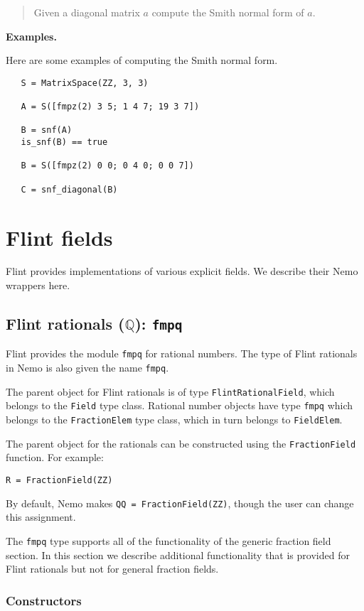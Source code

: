 \documentclass[a4paper,10pt]{article}
\newcommand{\Q}{\mathbb{Q}}
\newcommand{\code}{\lstinline}
\newcommand{\desc}[1]{\vspace{-3mm}\begin{quote}#1\end{quote}}
\begin{document}
{{\desc{Given a diagonal matrix $a$ compute the Smith normal form of $a$.}

\textbf{Examples.}

Here are some examples of computing the Smith normal form.

\begin{lstlisting}
   S = MatrixSpace(ZZ, 3, 3)

   A = S([fmpz(2) 3 5; 1 4 7; 19 3 7])
   
   B = snf(A)
   is_snf(B) == true

   B = S([fmpz(2) 0 0; 0 4 0; 0 0 7])

   C = snf_diagonal(B)
\end{lstlisting}

\section{Flint fields}

Flint provides implementations of various explicit fields. We describe their
Nemo wrappers here.

\subsection{Flint rationals ($\Q$): \code|fmpq|}

Flint provides the module \code{fmpq} for rational numbers. The type of Flint rationals
in Nemo is also given the name \code{fmpq}.

The parent object for Flint rationals is of type \code{FlintRationalField}, which
belongs to the \code{Field} type class. Rational number objects have type \code{fmpq}
which belongs to the \code{FractionElem} type class, which in turn belongs to 
\code{FieldElem}.

The parent object for the rationals can be constructed using the \code{FractionField}
function. For example:

\begin{lstlisting}
R = FractionField(ZZ)
\end{lstlisting}

By default, Nemo makes \code{QQ = FractionField(ZZ)}, though the user can change this
assignment.

The \code{fmpq} type supports all of the functionality of the generic fraction field
section. In this section we describe additional functionality that is provided for
Flint rationals but not for general fraction fields.

\subsubsection{Constructors}

}}
\end{document}

